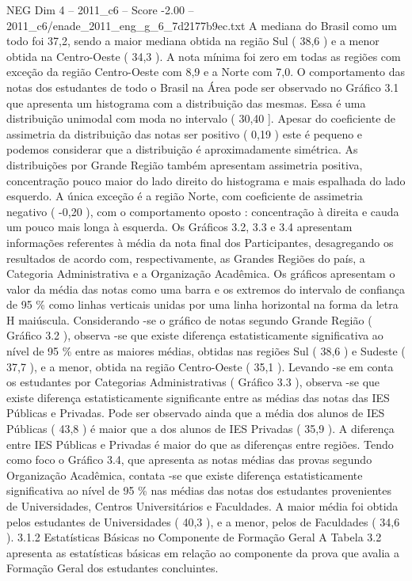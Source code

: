 \begin{textsample}{NEG Dim 4 – 2011\_c6 – Score -2.00 – 2011\_c6/enade\_2011\_eng\_g\_6\_7d2177b9ec.txt}
A mediana do Brasil como um todo foi 37,2, sendo a maior mediana obtida na região Sul ( 38,6 ) e a menor obtida na Centro-Oeste ( 34,3 ).
A nota mínima foi zero em todas as regiões com exceção da região Centro-Oeste com 8,9 e a Norte com 7,0.
O comportamento das notas dos estudantes de todo o Brasil na Área pode ser observado no Gráfico 3.1 que apresenta um histograma com a distribuição das mesmas.
Essa é uma distribuição unimodal com moda no intervalo ( 30,40 ].
Apesar do coeficiente de assimetria da distribuição das notas ser positivo ( 0,19 ) este é pequeno e podemos considerar que a distribuição é aproximadamente simétrica.
As distribuições por Grande Região também apresentam assimetria positiva, concentração pouco maior do lado direito do histograma e mais espalhada do lado esquerdo.
A única exceção é a região Norte, com coeficiente de assimetria negativo ( -0,20 ), com o comportamento oposto : concentração à direita e cauda um pouco mais longa à esquerda.
Os Gráficos 3.2, 3.3 e 3.4 apresentam informações referentes à média da nota final dos Participantes, desagregando os resultados de acordo com, respectivamente, as Grandes Regiões do país, a Categoria Administrativa e a Organização Acadêmica.
Os gráficos apresentam o valor da média das notas como uma barra e os extremos do intervalo de confiança de 95 \% como linhas verticais unidas por uma linha horizontal na forma da letra H maiúscula.
Considerando -se o gráfico de notas segundo Grande Região ( Gráfico 3.2 ), observa -se que existe diferença estatisticamente significativa ao nível de 95 \% entre as maiores médias, obtidas nas regiões Sul ( 38,6 ) e Sudeste ( 37,7 ), e a menor, obtida na região Centro-Oeste ( 35,1 ).
Levando -se em conta os estudantes por Categorias Administrativas ( Gráfico 3.3 ), observa -se que existe diferença estatisticamente significante entre as médias das notas das IES Públicas e Privadas.
Pode ser observado ainda que a média dos alunos de IES Públicas ( 43,8 ) é maior que a dos alunos de IES Privadas ( 35,9 ).
A diferença entre IES Públicas e Privadas é maior do que as diferenças entre regiões.
Tendo como foco o Gráfico 3.4, que apresenta as notas médias das provas segundo Organização Acadêmica, contata -se que existe diferença estatisticamente significativa ao nível de 95 \% nas médias das notas dos estudantes provenientes de Universidades, Centros Universitários e Faculdades.
A maior média foi obtida pelos estudantes de Universidades ( 40,3 ), e a menor, pelos de Faculdades ( 34,6 ). 3.1.2 Estatísticas Básicas no Componente de Formação Geral A Tabela 3.2 apresenta as estatísticas básicas em relação ao componente da prova que avalia a Formação Geral dos estudantes concluintes.

\end{textsample}
